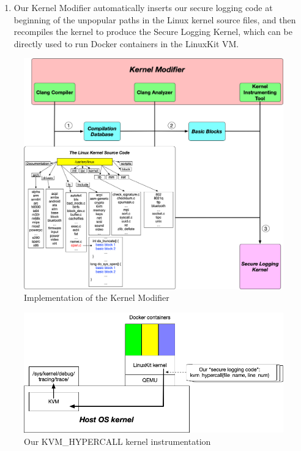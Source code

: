 \begin{enumerate}
	and our instrumenting tool will add the security logging code at the beginning of this block. If we discover that an entire function has no  lines in the popular paths data, we consider this an unpopular function, 
	and just add our security logging code once where it starts . This allows us to avoid adding redundant and unnecessary code. 
	The secure logging code we inserted in front of the unpopular paths was a kvm hypercall from the LinuxKit kernel into the host Linux kernel (Shown in Figure \ref{fig:kvm_hypercall}). 
	In this way, we can guarantee minimal affect on the LinuxKit kernel functionality, while still being able to generate security logging whenever unpopular paths were reached.
	\item Our Kernel Modifier automatically inserts our secure logging code at beginning of the unpopular paths in the Linux kernel source files, 
	and then recompiles the kernel to produce the Secure Logging Kernel, which can be directly used to run Docker containers in the LinuxKit VM. 
\end{enumerate}

\begin{figure}
\centering
\includegraphics[width=1.5\columnwidth]{diagram/linuxkit-kernel-modifier.png}
\caption{\small Implementation of the Kernel Modifier}
\label{fig:linuxkit-kernel-modifier}
\end{figure}

\begin{figure}
\centering
\includegraphics[width=1.5\columnwidth]{diagram/kvm_hypercall.png}
\caption{\small Our KVM\_HYPERCALL kernel instrumentation}
\label{fig:kvm_hypercall}
\end{figure}
